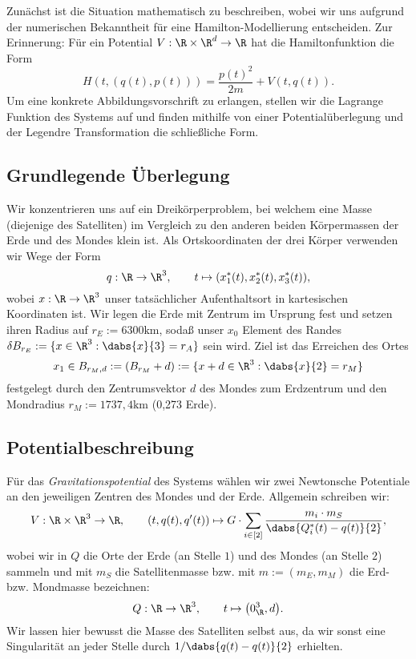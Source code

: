 \documentclass{subfiles}
\begin{document}
    

    Zunächst ist die Situation mathematisch zu beschreiben, wobei wir uns aufgrund der numerischen Bekanntheit für eine Hamilton-Modellierung entscheiden. Zur Erinnerung: Für ein Potential $V:\R\times\R^d\to\R$ hat die Hamiltonfunktion die Form 
    \[
        H(t,(q(t),p(t))) = \frac{p(t)^2}{2m} + V(t,q(t)).
    \]
    Um eine konkrete Abbildungsvorschrift zu erlangen, stellen wir die Lagrange Funktion des Systems auf und finden mithilfe von einer Potentialüberlegung und der Legendre Transformation die schließliche Form. 

    \subsection*{Grundlegende Überlegung}
        Wir konzentrieren uns auf ein Dreikörperproblem, bei welchem eine Masse (diejenige des Satelliten) im Vergleich zu den anderen beiden Körpermassen der Erde und des Mondes klein ist. Als Ortskoordinaten der drei Körper verwenden wir Wege der Form 
        \[
            q:\R\to\R^3,\qquad t\mapsto (x_1^*(t),x_2^*(t),x_3^*(t)),
        \]
        wobei $x:\R\to\R^3$ unser tatsächlicher Aufenthaltsort in kartesischen Koordinaten ist. Wir legen die Erde mit Zentrum im Ursprung fest und setzen ihren Radius auf $r_E:=6300\si{\kilo\metre}$, sodaß unser $x_0$ Element des Randes $\delta B_{r_E}:=\{x\in\R^3:\dabs{x}{3} = r_A\}$ sein wird. Ziel ist das Erreichen des Ortes
        \[
            x_1\in B_{r_M,d}:=(B_{r_M}+d):=\{x + d\in\R^3:\dabs{x}{2} = r_M\}
        \]
        festgelegt durch den Zentrumsvektor $d$ des Mondes zum Erdzentrum und den Mondradius $r_M:=1 737,4\si{\kilo\metre}$ (0,273 Erde).

    \subsection*{Potentialbeschreibung}
        Für das \emph{Gravitationspotential} des Systems wählen wir zwei Newtonsche Potentiale an den jeweiligen Zentren des Mondes und der Erde. Allgemein schreiben wir:
        \[
            V:\R\times\R^3\to \R,\qquad (t,q(t),q'(t))\mapsto G\cdot\sum_{i\in[2]}\frac{m_i\cdot m_S}{\dabs{Q_i^*(t) - q(t)}{2}},
        \]
        wobei wir in $Q$ die Orte der Erde (an Stelle $1$) und des Mondes (an Stelle $2$) sammeln und mit $m_S$ die Satellitenmasse bzw. mit $m:=(m_E,m_M)$ die Erd- bzw. Mondmasse bezeichnen:
        \[
            Q:\R\to\R^3,\qquad t\mapsto \bigl(0_\R^3,d\bigr).
        \]
        Wir lassen hier bewusst die Masse des Satelliten selbst aus, da wir sonst eine Singularität an jeder Stelle durch $1/\dabs{q(t)-q(t)}{2}$ erhielten. 
\end{document}
